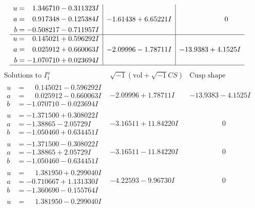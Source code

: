 \documentclass[1p]{elsarticle_modified}
\theoremstyle{definition}
\newcommand{\I}{\sqrt{-1}}
\begin{document}
$$\begin{array}{c|c|c}
\begin{aligned}
u &= \phantom{-}1.346710 - 0.311323 I \\
a &= \phantom{-}0.917348 - 0.125384 I \\
b &= -0.508217 - 0.711957 I\end{aligned}
 & -1.61438 + 6.65221 I & \phantom{-0.000000 } 0 \\ \hline\begin{aligned}
u &= \phantom{-}0.145021 + 0.596292 I \\
a &= \phantom{-}0.025912 + 0.660063 I \\
b &= -1.070710 + 0.023694 I\end{aligned}
 & -2.09996 - 1.78711 I & -13.9383 + 4.1525 I\\
 \hline 
 \end{array}$$\newpage$$\begin{array}{c|c|c}  
\text{Solutions to }I^u_{1}& \I (\text{vol} + \sqrt{-1}CS) & \text{Cusp shape}\\
 \hline 
\begin{aligned}
u &= \phantom{-}0.145021 - 0.596292 I \\
a &= \phantom{-}0.025912 - 0.660063 I \\
b &= -1.070710 - 0.023694 I\end{aligned}
 & -2.09996 + 1.78711 I & -13.9383 - 4.1525 I \\ \hline\begin{aligned}
u &= -1.371500 + 0.308022 I \\
a &= -1.38865 - 2.05729 I \\
b &= -1.050460 + 0.634451 I\end{aligned}
 & -3.16511 + 11.84220 I & \phantom{-0.000000 } 0 \\ \hline\begin{aligned}
u &= -1.371500 - 0.308022 I \\
a &= -1.38865 + 2.05729 I \\
b &= -1.050460 - 0.634451 I\end{aligned}
 & -3.16511 - 11.84220 I & \phantom{-0.000000 } 0 \\ \hline\begin{aligned}
u &= \phantom{-}1.381950 + 0.299040 I \\
a &= -0.710667 + 1.131330 I \\
b &= -1.360690 - 0.155764 I\end{aligned}
 & -4.22593 - 9.96730 I & \phantom{-0.000000 } 0 \\ \hline\begin{aligned}
u &= \phantom{-}1.381950 - 0.299040 I \\

\end{aligned}
\end{array}$$
\end{document}
